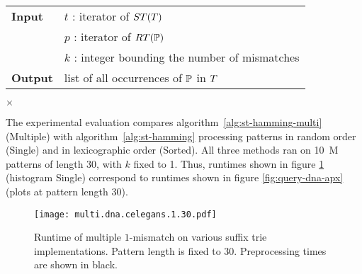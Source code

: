 \begin{figure*}[t]
\begin{center}
\begin{minipage}[t]{.8\textwidth}
\begin{algorithm}[H]
\begin{tabular}{ll}
\textbf{Input}  & $t$ : iterator of $ST(T)$\\
 			    & $p$ : iterator of $RT(\mathbb{P})$\\
 			    & $k$ : integer bounding the number of mismatches\\
\textbf{Output} & list of all occurrences of $\mathbb{P}$ in $T$\\
\end{tabular}
\begin{algorithmic}[1]
\Else
		\State \Report {} $\times$ 
		\Repeat
			\Repeat
				\State {}
	\EndIf
\EndIf
\end{algorithmic}
\label{alg:st-hamming-multi}
\end{algorithm}
\end{minipage}
\end{center}
\end{figure*}

The experimental evaluation compares algorithm~\ref{alg:st-hamming-multi} (Multiple) with algorithm~\ref{alg:st-hamming} processing patterns in random order (Single) and in lexicographic order (Sorted).
All three methods ran on 10~M patterns of length 30, with $k$ fixed to 1.
Thus, runtimes shown in figure \ref{fig:query-dna-apx-multi} (histogram Single) correspond to runtimes shown in figure \ref{fig:query-dna-apx} (plots at pattern length 30).

\begin{figure}[b]
\begin{center}
\caption[Multiple $k$-mismatches runtime]{Runtime of multiple $1$-mismatch on various suffix trie implementations. Pattern length is fixed to 30. Preprocessing times are shown in black.}
\label{fig:query-dna-apx-multi}
\texttt{[image: multi.dna.celegans.1.30.pdf]}
\end{center}
\end{figure}


